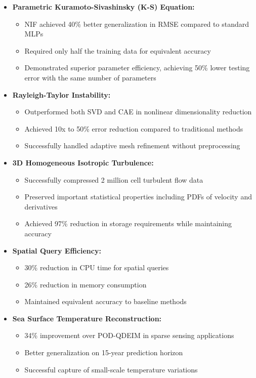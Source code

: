 \documentclass[10pt,journal,compsoc,onecolumn]{IEEEtran}
\begin{document}
\begin{itemize}
    \item \textbf{Parametric Kuramoto-Sivashinsky (K-S) Equation:}
    \begin{itemize}
        \item NIF achieved 40\% better generalization in RMSE compared to standard MLPs
        \item Required only half the training data for equivalent accuracy
        \item Demonstrated superior parameter efficiency, achieving 50\% lower testing error with the same number of parameters
    \end{itemize}
    
    \item \textbf{Rayleigh-Taylor Instability:}
    \begin{itemize}
        \item Outperformed both SVD and CAE in nonlinear dimensionality reduction
        \item Achieved 10x to 50\% error reduction compared to traditional methods
        \item Successfully handled adaptive mesh refinement without preprocessing
    \end{itemize}
    
    \item \textbf{3D Homogeneous Isotropic Turbulence:}
    \begin{itemize}
        \item Successfully compressed 2 million cell turbulent flow data
        \item Preserved important statistical properties including PDFs of velocity and derivatives
        \item Achieved 97\% reduction in storage requirements while maintaining accuracy
    \end{itemize}
    
    \item \textbf{Spatial Query Efficiency:}
    \begin{itemize}
        \item 30\% reduction in CPU time for spatial queries
        \item 26\% reduction in memory consumption
        \item Maintained equivalent accuracy to baseline methods
    \end{itemize}
    
    \item \textbf{Sea Surface Temperature Reconstruction:}
    \begin{itemize}
        \item 34\% improvement over POD-QDEIM in sparse sensing applications
        \item Better generalization on 15-year prediction horizon
        \item Successful capture of small-scale temperature variations
    \end{itemize}
\end{itemize}
\end{document}
